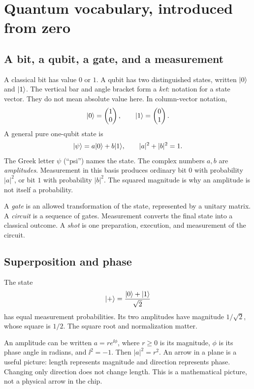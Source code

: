 \clearpage
\section{Quantum vocabulary, introduced from zero}\label{sec:vocabulary}
\subsection{A bit, a qubit, a gate, and a measurement}
A classical bit has value $0$ or $1$. A qubit has two distinguished states,
written $\lvert 0\rangle$ and $\lvert 1\rangle$. The vertical bar and angle bracket form a
\emph{ket}: notation for a state vector. They do not mean absolute value here.
In column-vector notation,
\begin{equation}
\lvert 0\rangle=\begin{pmatrix}1\\0\end{pmatrix},\qquad
\lvert 1\rangle=\begin{pmatrix}0\\1\end{pmatrix}.
\end{equation}
A general pure one-qubit state is
\begin{equation}\label{eq:one-qubit-state}
\lvert \psi\rangle=a\lvert 0\rangle+b\lvert 1\rangle,\qquad |a|^2+|b|^2=1.
\end{equation}
The Greek letter $\psi$ (``psi'') names the state. The complex numbers $a,b$ are
\emph{amplitudes}. Measurement in this basis produces ordinary bit $0$ with
probability $|a|^2$, or bit $1$ with probability $|b|^2$. The squared magnitude
is why an amplitude is not itself a probability.

A \emph{gate} is an allowed transformation of the state, represented by a
unitary matrix. A \emph{circuit} is a sequence of gates. Measurement converts
the final state into a classical outcome. A \emph{shot} is one preparation,
execution, and measurement of the circuit.

\subsection{Superposition and phase}
The state
\begin{equation}
\lvert +\rangle=\frac{\lvert 0\rangle+\lvert 1\rangle}{\sqrt 2}
\end{equation}
has equal measurement probabilities. Its two amplitudes have magnitude
$1/\sqrt2$, whose square is $1/2$. The square root and normalization matter.

An amplitude can be written $a=r e^{\ii\phi}$, where $r\ge0$ is its magnitude,
$\phi$ is its phase angle in radians, and $\ii^2=-1$. Then $|a|^2=r^2$.
An arrow in a plane is a useful picture: length represents magnitude and
direction represents phase. Changing only direction does not change length.
This is a mathematical picture, not a physical arrow in the chip.

